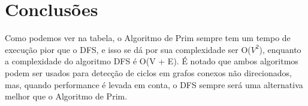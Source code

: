 \documentclass[12pt]{article}
\begin{document}
\section{Conclusões}
Como podemos ver na tabela, o Algoritmo de Prim sempre tem um tempo de execução pior que o DFS, e isso
se dá por sua complexidade ser O($V^2$), enquanto a complexidade do algoritmo DFS é O(V + E).
É notado que ambos algoritmos podem ser usados para detecção de ciclos em grafos conexos não direcionados, mas, quando performance
é levada em conta, o DFS sempre será uma alternativa melhor que o Algoritmo de Prim.
\end{document}
